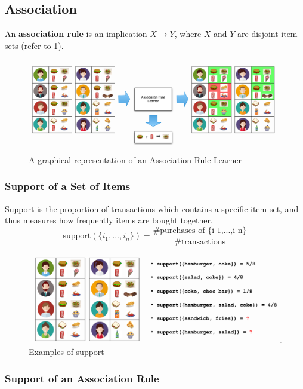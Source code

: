 \documentclass[11pt]{article}
\begin{document}
\subsection{Association}

An \textbf{association rule} is an implication $X\rightarrow Y$, where $X$ and $Y$ are disjoint item sets (refer to \ref{fig:associationrule}).

\begin{figure}[htb!]
    \centering
    \includegraphics[keepaspectratio, width=0.7\linewidth]{Pictures/association_rule}
    \caption{A graphical representation of an Association Rule Learner}
    \label{fig:associationrule}
\end{figure}

\subsubsection{Support of a Set of Items}

Support is the proportion of transactions which contains a specific item set, and thus measures how frequently items are bought together.
\begin{equation*}
    \text{support}(\{i_1,...,i_n\}) = \frac{\#\text{purchases of \{i_1,...,i_n\}}}{\# \text{transactions}}
\end{equation*}

\begin{figure}[htb!]
    \centering
    \includegraphics[width=0.7\linewidth, keepaspectratio]{Pictures/support_example}
    \caption{Examples of support}
    \label{fig:supportexample}
\end{figure}

\subsubsection{Support of an Association Rule}
\end{document}
